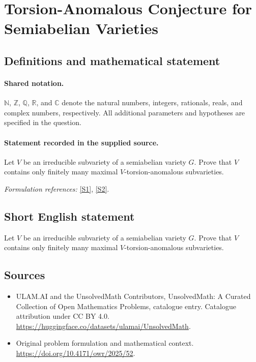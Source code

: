\documentclass[11pt]{article}
\newcommand{\sref}[2]{\hyperlink{source:#1:#2}{[S#2]}}
\begin{document}
\section{Torsion-Anomalous Conjecture for Semiabelian Varieties}\label{statement}

\subsection{Definitions and mathematical statement}

\paragraph{Shared notation.}$\mathbb N$, $\mathbb Z$, $\mathbb Q$, $\mathbb R$, and $\mathbb C$ denote the natural numbers, integers, rationals, reals, and complex numbers, respectively. All additional parameters and hypotheses are specified in the question.


\paragraph{Statement recorded in the supplied source.}
Let $V$ be an irreducible subvariety of a semiabelian variety $G$. Prove that $V$ contains only finitely many maximal $V$-torsion-anomalous subvarieties.
\par\smallskip\textit{Formulation references:} \sref{statement}{1}, \sref{statement}{2}.
\subsection{Short English statement}
Let $V$ be an irreducible subvariety of a semiabelian variety $G$. Prove that $V$ contains only finitely many maximal $V$-torsion-anomalous subvarieties.
\subsection{Sources}
\begin{itemize}
\item[\hypertarget{source:statement:1}{S1}] ULAM.AI and the UnsolvedMath Contributors, UnsolvedMath: A Curated Collection of Open Mathematics Problems, catalogue entry. Catalogue attribution under CC BY 4.0.
\url{https://huggingface.co/datasets/ulamai/UnsolvedMath}.
\item[\hypertarget{source:statement:2}{S2}] Original problem formulation and mathematical context.
\url{https://doi.org/10.4171/owr/2025/52}.
\end{itemize}
\label{end:statement}
\end{document}
